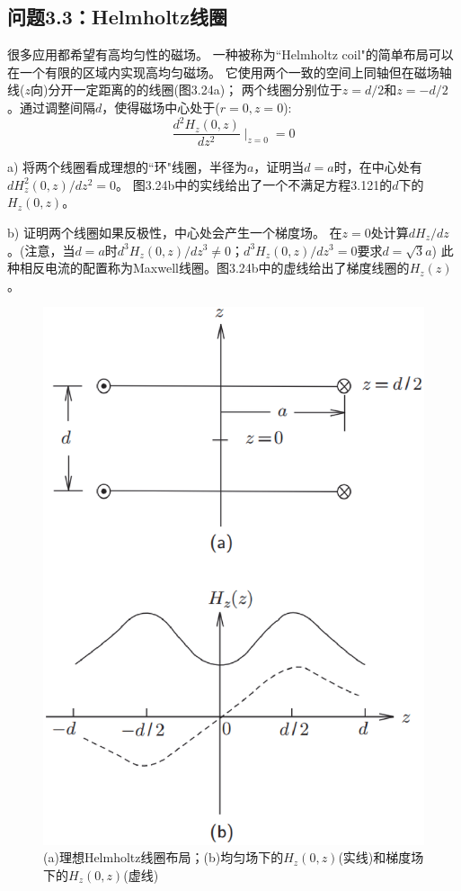 \subsection{问题3.3：Helmholtz线圈}
很多应用都希望有高均匀性的磁场。
一种被称为``Helmholtz coil"的简单布局可以在一个有限的区域内实现高均匀磁场。
它使用两个一致的空间上同轴但在磁场轴线($z$向)分开一定距离的的线圈(图3.24a)；
两个线圈分别位于$z = d/2$和$z = −d/2$。通过调整间隔$d$，使得磁场中心处于($r=0,z=0$):
\begin{equation}%
\frac{d^2H_z(0,z)}{dz^2}\mid_{z=0}=0
\end{equation}

a) 将两个线圈看成理想的``环"线圈，半径为$a$，证明当$d=a$时，在中心处有$dH^2_z(0, z)/dz^2 = 0$。
图3.24b中的实线给出了一个不满足方程3.121的$d$下的$H_z(0, z)$。

b) 证明两个线圈如果反极性，中心处会产生一个梯度场。
在$z=0$处计算$dH_z/dz$。(注意，当$d=a$时$d^3H_z(0,z)/dz^3 \neq 0$；$d^3H_z(0,z)/dz^3=0$要求$d=\sqrt{3}a$) 
此种相反电流的配置称为Maxwell线圈。图3.24b中的虚线给出了梯度线圈的$H_z(z)$。

\begin{figure}[htbp]
	\centering
	\includegraphics[scale=0.4]{chpt3/figs/fig3.24.eps}
	\caption{(a)理想Helmholtz线圈布局；(b)均匀场下的$H_z(0,z)$(实线)和梯度场下的$H_z(0,z)$(虚线)}
\end{figure}

